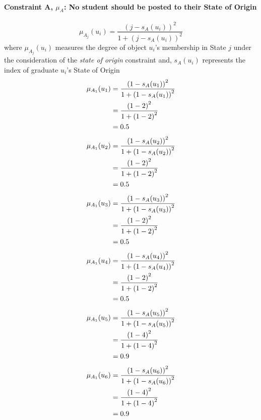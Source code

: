 \documentclass[a4paper]{book}
\begin{document}
			\paragraph{Constraint A, $\mu_A$: No student should be posted to their State of Origin}
				\begin{equation}
					\mu_{A_j}(u_i) = \frac{\left(j-s_A(u_i)\right)^2}{1 + \left(j-s_A(u_i)\right)^2}
				\end{equation}
				where $\mu_{A_j}(u_i)$ measures the degree of object $u_i$'s membership in State $j$ under the consideration of the \textit{state of origin} constraint and,
				$s_A(u_i)$ represents the index of graduate $u_i$'s State of Origin\\
				\begin{align}
					\mu_{A_1}(u_1) &= \frac{\left(1-s_A(u_1)\right)^2}{1 + \left(1-s_A(u_1)\right)^2}\\
					&= \frac{\left(1-2\right)^2}{1 + \left(1-2\right)^2} \notag \\
					&= 0.5 \notag
				\end{align}
				\begin{align}
					\mu_{A_1}(u_2) &= \frac{\left(1-s_A(u_2)\right)^2}{1 + \left(1-s_A(u_2)\right)^2}\\
					&= \frac{\left(1-2\right)^2}{1 + \left(1-2\right)^2} \notag \\
					&= 0.5 \notag
				\end{align}
				\begin{align}
					\mu_{A_1}(u_3) &= \frac{\left(1-s_A(u_3)\right)^2}{1 + \left(1-s_A(u_3)\right)^2}\\
					&= \frac{\left(1-2\right)^2}{1 + \left(1-2\right)^2} \notag \\
					&= 0.5 \notag
				\end{align}
				\begin{align}
					\mu_{A_1}(u_4) &= \frac{\left(1-s_A(u_4)\right)^2}{1 + \left(1-s_A(u_4)\right)^2}\\
					&= \frac{\left(1-2\right)^2}{1 + \left(1-2\right)^2} \notag \\
					&= 0.5 \notag
				\end{align}
				\begin{align}
					\mu_{A_1}(u_5) &= \frac{\left(1-s_A(u_5)\right)^2}{1 + \left(1-s_A(u_5)\right)^2}\\
					&= \frac{\left(1-4\right)^2}{1 + \left(1-4\right)^2} \notag \\
					&= 0.9 \notag
				\end{align}
				\begin{align}
					\mu_{A_1}(u_6) &= \frac{\left(1-s_A(u_6)\right)^2}{1 + \left(1-s_A(u_6)\right)^2}\\
					&= \frac{\left(1-4\right)^2}{1 + \left(1-4\right)^2} \notag \\
					&= 0.9 \notag
				\end{align}
\end{document}
